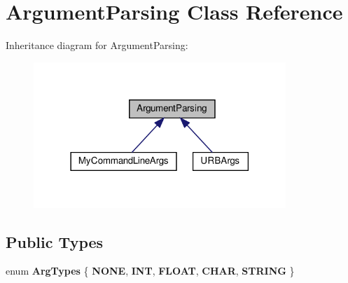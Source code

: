 \hypertarget{classArgumentParsing}{}\section{Argument\+Parsing Class Reference}
\label{classArgumentParsing}


Inheritance diagram for Argument\+Parsing\+:
\nopagebreak
\begin{figure}[H]
\begin{center}
\leavevmode
\includegraphics[width=270pt]{classArgumentParsing__inherit__graph}
\end{center}
\end{figure}
\subsection*{Public Types}
\begin{DoxyCompactItemize}
\item 
\mbox{\label{classArgumentParsing_afc7b06f169fe65ee044117603822d751}} 
enum {\bfseries Arg\+Types} \{ \newline
{\bfseries N\+O\+NE}, 
{\bfseries I\+NT}, 
{\bfseries F\+L\+O\+AT}, 
{\bfseries C\+H\+AR}, 
\newline
{\bfseries S\+T\+R\+I\+NG}
 \}
\end{DoxyCompactItemize}
